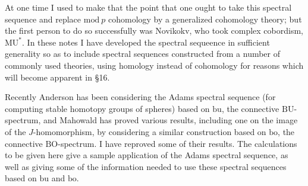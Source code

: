 \documentclass[../main]{subfiles}
\begin{document}
At one time I used to make that the point that one ought to take this spectral sequence and replace $\mathrm{mod}\ p$ cohomology by a generalized cohomology theory; but the first person to do so successfully was Novikokv, who took complex cobordism, $\mathrm{MU}^*$. In these notes I have developed the spectral sequeence in sufficient generality so as to include spectral sequences constructed from a number of commonly used theories, using homology instead of cohomology for reasons which will become apparent in \S 16.

Recently Anderson has been considering the Adams spectral sequence (for computing stable homotopy groups of spheres) based on $\mathrm{bu}$, the connective $\mathrm{BU}$-spectrum, and Mahowald has proved various results, including one on the image of the $J$-homomorphism, by considering a similar construction based on $\mathrm{bo}$, the connective $\mathrm{BO}$-spectrum. I have reproved some of their results. The calculations to be given here give a sample application of the Adams spectral sequence, as well as giving some of the information needed to use these spectral sequences based on $\mathrm{bu}$ and $\mathrm{bo}$.
\end{document}
